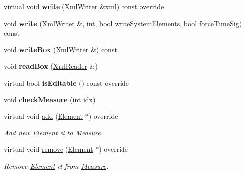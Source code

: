 \begin{DoxyCompactItemize}
virtual void {\bfseries write} (\hyperlink{class_ms_1_1_xml_writer}{Xml\+Writer} \&xml) const override
\item 
\mbox{\label{class_ms_1_1_measure_a972233bd3791b04d14857f9fcce25346}} 
void {\bfseries write} (\hyperlink{class_ms_1_1_xml_writer}{Xml\+Writer} \&, int, bool write\+System\+Elements, bool force\+Time\+Sig) const
\item 
\mbox{\label{class_ms_1_1_measure_a58a0d5df7cc517f65e5f127efa94f722}} 
void {\bfseries write\+Box} (\hyperlink{class_ms_1_1_xml_writer}{Xml\+Writer} \&) const
\item 
\mbox{\label{class_ms_1_1_measure_a4770735f3f9c4e80167be9d48e2855c1}} 
void {\bfseries read\+Box} (\hyperlink{class_ms_1_1_xml_reader}{Xml\+Reader} \&)
\item 
\mbox{\label{class_ms_1_1_measure_a10610144aa3f4679d11575c70c78fc25}} 
virtual bool {\bfseries is\+Editable} () const override
\item 
\mbox{\label{class_ms_1_1_measure_a8f22e407bfbfaf695bf68ebf9fc4e8f6}} 
void {\bfseries check\+Measure} (int idx)
\item 
\mbox{\label{class_ms_1_1_measure_a817b1bd3c14e6d5e9ba961ccd092e45b}} 
virtual void \hyperlink{class_ms_1_1_measure_a817b1bd3c14e6d5e9ba961ccd092e45b}{add} (\hyperlink{class_ms_1_1_element}{Element} $\ast$) override
\begin{DoxyCompactList}\small\item\em Add new \hyperlink{class_ms_1_1_element}{Element} {\itshape el} to \hyperlink{class_ms_1_1_measure}{Measure}. \end{DoxyCompactList}\item 
\mbox{\label{class_ms_1_1_measure_aeab577d3e439c3b0577ee8eb3866a1f6}} 
virtual void \hyperlink{class_ms_1_1_measure_aeab577d3e439c3b0577ee8eb3866a1f6}{remove} (\hyperlink{class_ms_1_1_element}{Element} $\ast$) override
\begin{DoxyCompactList}\small\item\em Remove \hyperlink{class_ms_1_1_element}{Element} {\itshape el} from \hyperlink{class_ms_1_1_measure}{Measure}. \end{DoxyCompactList}\item 

\end{DoxyCompactItemize}
